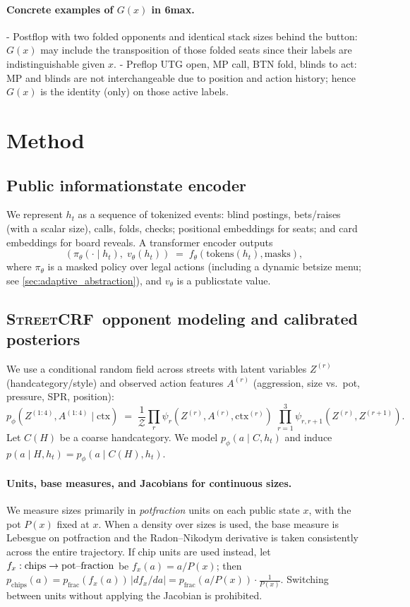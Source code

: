 \documentclass[10pt]{article}
\newcommand{\sCRF}{\textsc{Street\textendash CRF}\xspace}
\newcommand{\1}{\mathbf{1}}
\theoremstyle{plain}
\begin{document}
\paragraph{Concrete examples of $G(x)$ in 6\textendash max.}
- Postflop with two folded opponents and identical stack sizes behind the button: $G(x)$ may include the transposition of those folded seats since their labels are indistinguishable given $x$.
- Preflop UTG open, MP call, BTN fold, blinds to act: MP and blinds are not interchangeable due to position and action history; hence $G(x)$ is the identity (only) on those active labels.

\section{Method}
\subsection{Public information\textendash state encoder}
We represent $h_t$ as a sequence of tokenized events: blind postings, bets/raises (with a scalar size), calls, folds, checks; positional embeddings for seats; and card embeddings for board reveals. A transformer encoder outputs
\[
(\pi_\theta(\cdot\mid h_t),\; v_\theta(h_t)) \;=\; f_\theta(\text{tokens}(h_t), \text{masks}),
\]
where $\pi_\theta$ is a masked policy over legal actions (including a dynamic bet\textendash size menu; see \cref{sec:adaptive_abstraction}), and $v_\theta$ is a public\textendash state value.

\subsection{\sCRF\ opponent modeling and calibrated posteriors}
We use a conditional random field across streets with latent variables $Z^{(r)}$ (hand\textendash category/style) and observed action features $A^{(r)}$ (aggression, size vs.\ pot, pressure, SPR, position):
\[
p_\phi(Z^{(1:4)}, A^{(1:4)}\mid \text{ctx}) \;=\; \frac{1}{\mathcal{Z}} \prod_r \psi_r(Z^{(r)},A^{(r)},\text{ctx}^{(r)})\;\prod_{r=1}^{3}\psi_{r,r+1}(Z^{(r)},Z^{(r+1)}).
\]
Let $C(H)$ be a coarse hand\textendash category. We model $p_\phi(a\mid C,h_t)$ and induce $p(a\mid H,h_t)=p_\phi(a\mid C(H),h_t)$.

\paragraph{Units, base measures, and Jacobians for continuous sizes.}
We measure sizes primarily in \emph{pot\textendash fraction} units on each public state $x$, with the pot $P(x)$ fixed at $x$. When a density over sizes is used, the base measure is Lebesgue on pot\textendash fraction and the Radon--Nikodym derivative is taken consistently across the entire trajectory. If chip units are used instead, let $f_x:\text{chips}\to\text{pot\textendash fraction}$ be $f_x(a)=a/P(x)$; then $p_{\text{chips}}(a)=p_{\text{frac}}(f_x(a))\,|df_x/da|=p_{\text{frac}}(a/P(x))\cdot \tfrac{1}{P(x)}$. Switching between units without applying the Jacobian is prohibited.
\end{document}

